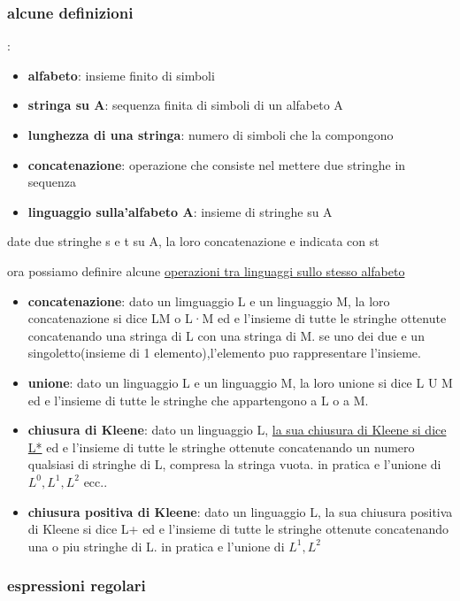\documentclass[12pt]{article}
\begin{document}
\subsubsection{alcune definizioni}:
\begin{itemize}
\item \textbf{alfabeto}: insieme finito di simboli
\item \textbf{stringa su A}: sequenza finita di simboli di un alfabeto A
\item \textbf{lunghezza di una stringa}: numero di simboli che la compongono
\item \textbf{concatenazione}: operazione che consiste nel mettere due stringhe in sequenza
\item \textbf{linguaggio sulla'alfabeto A}: insieme di stringhe su A
\end{itemize}

date due stringhe s e t su A, la loro concatenazione e indicata con st

ora possiamo definire alcune \underline{operazioni tra linguaggi sullo stesso alfabeto}
\begin{itemize}
\item \textbf{concatenazione}: dato un limguaggio L e un linguaggio M, la loro concatenazione si dice LM o L·M ed e l'insieme di tutte le stringhe ottenute concatenando una stringa di L con una stringa di M. se uno dei due e un singoletto(insieme di 1 elemento),l'elemento puo rappresentare l'insieme.
\item \textbf{unione}: dato un linguaggio L e un linguaggio M, la loro unione si dice L U M ed e l'insieme di tutte le stringhe che appartengono a L o a M.
\item \textbf{chiusura di Kleene}: dato un linguaggio L, \underline{la sua chiusura di Kleene si dice L*} ed e l'insieme di tutte le stringhe ottenute concatenando un numero qualsiasi di stringhe di L, compresa la stringa vuota. in pratica e l'unione di $L^0,L^1,L^2$ ecc..
\item \textbf{chiusura positiva di Kleene}: dato un linguaggio L, la sua chiusura positiva di Kleene si dice L+ ed e l'insieme di tutte le stringhe ottenute concatenando una o piu stringhe di L. in pratica e l'unione di $L^1,L^2$
\end{itemize}

\subsubsection{espressioni regolari}
\end{document}

